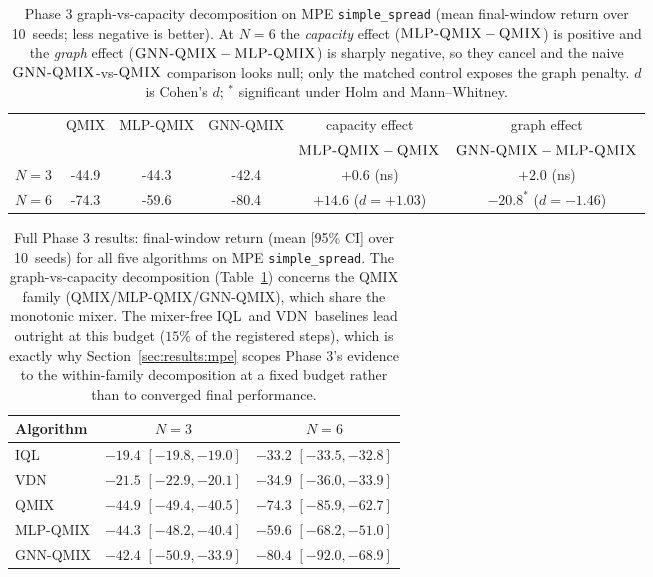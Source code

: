 \documentclass[10pt]{article}
\newcommand{\algoname}[1]{\textsc{#1}}
\newcommand{\iql}{\algoname{IQL}}
\newcommand{\vdn}{\algoname{VDN}}
\newcommand{\qmix}{\algoname{QMIX}}
\newcommand{\gnnqmix}{\algoname{GNN-QMIX}}
\newcommand{\mlpqmix}{\algoname{MLP-QMIX}}
\newcommand{\PEseeds}{10}             %
\newcommand{\PMqmixNthree}{-44.9}
\newcommand{\PMmlpNthree}{-44.3}
\newcommand{\PMgnnNthree}{-42.4}
\newcommand{\PMqmixNsix}{-74.3}
\newcommand{\PMmlpNsix}{-59.6}
\newcommand{\PMgnnNsix}{-80.4}
\newcommand{\PMgraphGapNthree}{+2.0}  %
\newcommand{\PMgraphGapNsix}{-20.8}   %
\newcommand{\PMcapGapNthree}{+0.6}    %
\newcommand{\PMcapGapNsix}{+14.6}     %
\newcommand{\PMgraphDNsix}{-1.46}     %
\newcommand{\PMcapDNsix}{+1.03}       %
\begin{document}
\begin{table}[!ht]
  \centering
  \small
  \caption{Phase 3 graph-vs-capacity decomposition on MPE
  \texttt{simple\_spread} (mean final-window return over \PEseeds\ seeds;
  less negative is better). At $N{=}6$ the \emph{capacity} effect
  ($\mlpqmix-\qmix$) is positive and the \emph{graph} effect
  ($\gnnqmix-\mlpqmix$) is sharply negative, so they cancel and the naive
  $\gnnqmix$-vs-$\qmix$ comparison looks null; only the matched control
  exposes the graph penalty. $d$ is Cohen's $d$; ${}^\ast$ significant
  under Holm and Mann--Whitney.}
  \label{tab:mpe}
  \begin{tabular}{lccccc}
    \toprule
    & \qmix & \mlpqmix & \gnnqmix & capacity effect & graph effect \\
    & & & & {\footnotesize $\mlpqmix-\qmix$} & {\footnotesize $\gnnqmix-\mlpqmix$} \\
    \midrule
    $N=3$ & \PMqmixNthree & \PMmlpNthree & \PMgnnNthree
          & $\PMcapGapNthree$ (ns) & $\PMgraphGapNthree$ (ns) \\
    $N=6$ & \PMqmixNsix & \PMmlpNsix & \PMgnnNsix
          & $\PMcapGapNsix$ ($d{=}\PMcapDNsix$) & $\PMgraphGapNsix^\ast$ ($d{=}\PMgraphDNsix$) \\
    \bottomrule
  \end{tabular}
\end{table}

\begin{table}[!ht]
  \centering
  \small
  \caption{Full Phase 3 results: final-window return (mean [95\% CI] over
  \PEseeds\ seeds) for all five algorithms on MPE \texttt{simple\_spread}.
  The graph-vs-capacity decomposition (Table~\ref{tab:mpe}) concerns the
  QMIX family (\qmix/\mlpqmix/\gnnqmix), which share the monotonic mixer.
  The mixer-free \iql\ and \vdn\ baselines lead outright at this budget
  ($15\%$ of the registered steps), which is exactly why
  Section~\ref{sec:results:mpe} scopes Phase 3's evidence to the
  within-family decomposition at a fixed budget rather than to converged
  final performance.}
  \label{tab:mpe-full}
  \begin{tabular}{lcc}
    \toprule
    Algorithm & $N=3$ & $N=6$ \\
    \midrule
    \iql     & $-19.4$ {\footnotesize $[-19.8,-19.0]$} & $-33.2$ {\footnotesize $[-33.5,-32.8]$} \\
    \vdn     & $-21.5$ {\footnotesize $[-22.9,-20.1]$} & $-34.9$ {\footnotesize $[-36.0,-33.9]$} \\
    \qmix    & $-44.9$ {\footnotesize $[-49.4,-40.5]$} & $-74.3$ {\footnotesize $[-85.9,-62.7]$} \\
    \mlpqmix & $-44.3$ {\footnotesize $[-48.2,-40.4]$} & $-59.6$ {\footnotesize $[-68.2,-51.0]$} \\
    \gnnqmix & $-42.4$ {\footnotesize $[-50.9,-33.9]$} & $-80.4$ {\footnotesize $[-92.0,-68.9]$} \\
    \bottomrule
  \end{tabular}
\end{table}
\end{document}

